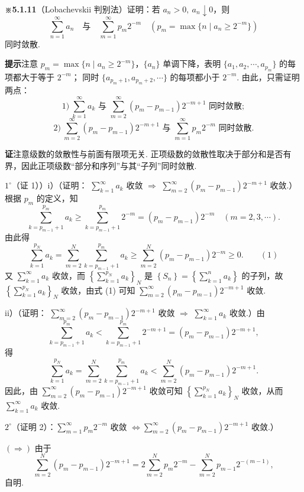 \documentclass[UTF8, 12pt, fontset=fandol, oneside]{ctexart}
\begin{document}
\noindent\textbf{※5.1.11}\quad （Lobachevskii 判别法）证明：若 $a_n>0,\ a_n\downarrow0$，则
\[
  \sum_{n=1}^{\infty}a_n\quad\text{与}\quad
  \sum_{m=1}^{\infty}p_m2^{-m}\quad
  (p_m=\max\{n\mid a_n\ge2^{-m}\})
\]
同时敛散.

\noindent\textbf{提示}\quad 注意 $p_m=\max\{n\mid a_n\ge2^{-m}\}$，$\{a_n\}$ 单调下降，表明
$\{a_1,a_2,\cdots,a_{p_m}\}$ 的每项都大于等于 $2^{-m}$；
同时 $\{a_{p_m+1},a_{p_m+2},\cdots\}$ 的每项都小于 $2^{-m}$.
由此，只需证明两点：
\[
  1)\ \sum_{k=1}^{\infty}a_k\text{ 与 }
  \sum_{m=2}^{\infty}(p_m-p_{m-1})2^{-m+1}\text{ 同时敛散};
\]
\[
  2)\ \sum_{m=2}^{\infty}(p_m-p_{m-1})2^{-m+1}\text{ 与 }
  \sum_{m=1}^{\infty}p_m2^{-m}\text{ 同时敛散}.
\]

\noindent\textbf{证}\quad 注意级数的敛散性与前面有限项无关. 正项级数的敛散性取决于部分和是否有界，因此正项级数“部分和序列”与其“子列”同时敛散.

$1^\circ$（证 1））i）（证明：
$\sum_{k=1}^{\infty}a_k$ 收敛 $\Rightarrow$
$\sum_{m=2}^{\infty}(p_m-p_{m-1})2^{-m+1}$ 收敛.）根据 $p_m$ 的定义，知
\[
  \sum_{k=p_{m-1}+1}^{p_m}a_k
  \ge \sum_{k=p_{m-1}+1}^{p_m}2^{-m}
  =(p_m-p_{m-1})2^{-m}\quad(m=2,3,\cdots).
\]
由此得
\[
  \sum_{k=1}^{p_N}a_k
  =\sum_{m=2}^N\sum_{k=p_{m-1}+1}^{p_m}a_k
  \ge\sum_{m=2}^N(p_m-p_{m-1})2^{-m}\ge0.
\qquad(1)
\]
又 $\sum_{k=1}^{\infty}a_k$ 收敛，而
$\left\{\sum_{k=1}^{p_N}a_k\right\}_N$ 是
$\left\{S_n\right\}=\left\{\sum_{k=1}^n a_k\right\}$ 的子列，故
$\left\{\sum_{k=1}^{p_N}a_k\right\}_N$ 收敛，由式 (1) 可知
$\sum_{m=2}^{\infty}(p_m-p_{m-1})2^{-m+1}$ 收敛.

ii）（证明：
$\sum_{m=2}^{\infty}(p_m-p_{m-1})2^{-m+1}$ 收敛 $\Rightarrow$
$\sum_{k=1}^{\infty}a_k$ 收敛.）由
\[
  \sum_{k=p_{m-1}+1}^{p_m}a_k
  <\sum_{k=p_{m-1}+1}^{p_m}2^{-m+1}
  =(p_m-p_{m-1})2^{-m+1},
\]
得
\[
  \sum_{k=1}^{p_N}a_k
  =\sum_{m=2}^N\sum_{k=p_{m-1}+1}^{p_m}a_k
  <\sum_{m=2}^N(p_m-p_{m-1})2^{-m+1}.
\]
因此，由 $\sum_{m=2}^{\infty}(p_m-p_{m-1})2^{-m+1}$ 收敛可知
$\left\{\sum_{k=1}^{p_N}a_k\right\}_N$ 收敛，从而
$\sum_{k=1}^{\infty}a_k$ 收敛.

$2^\circ$（证明 2）：$\sum_{m=1}^{\infty}p_m2^{-m}$ 收敛
$\Leftrightarrow\sum_{m=2}^{\infty}(p_m-p_{m-1})2^{-m+1}$ 收敛.）

$(\Rightarrow)$ 由于
\[
  \sum_{m=2}^N(p_m-p_{m-1})2^{-m+1}
  =2\sum_{m=2}^Np_m2^{-m}
    -\sum_{m=2}^Np_{m-1}2^{-(m-1)},
\]
自明.
\end{document}
